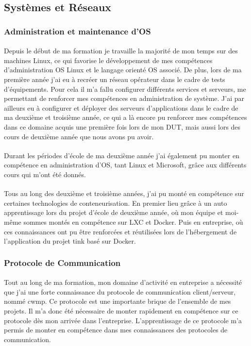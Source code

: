 \documentclass[12pt,a4paper]{report}
\begin{document}
\subsection{Systèmes et Réseaux}
\subsubsection{Administration et maintenance d'OS}
\paragraph*{}Depuis le début de ma formation je travaille la majorité de mon temps sur des machines Linux, ce qui favorise le développement de mes compétences d'administration OS Linux et le langage orienté OS associé. De plus, lors de ma première année j'ai eu à recréer un réseau opérateur dans le cadre de tests d'équipements. Pour cela il m'a fallu configurer différents services et serveurs, me permettant de renforcer mes compétences en administration de système. J'ai par ailleurs eu à configurer et déployer des serveurs d'applications dans le cadre de ma deuxième et troisième année, ce qui a là encore pu renforcer mes compétences dans ce domaine acquis une première fois lors de mon DUT, mais aussi lors des cours de deuxième année que nous avons pu avoir.
\paragraph*{}Durant les périodes d'école de ma deuxième année j'ai également pu monter en compétence en administration d'OS, tant Linux et Microsoft, grâce aux différents cours qui m'ont été donnés.
\paragraph*{}Tous au long des deuxième et troisième années, j'ai pu monté en compétence sur certaines technologies de conteneurisation. En premier lieu grâce à un auto apprentissage lors du projet d'école de deuxième année, où mon équipe et moi-même sommes montés en compétence sur LXC et Docker. Puis en entreprise, où ces connaissances ont pu être renforcées et réutilisées lors de l'hébergement de l'application du projet \gls{tink} basé sur Docker. \\
\subsubsection{Protocole de Communication}
\paragraph*{}Tout au long de ma formation, mon domaine d'activité en entreprise a nécessité que j'ai une forte connaissance du protocole de communication client/serveur, nommé \gls{cwmp}. Ce protocole est une importante brique de l'ensemble de mes projets. Il m'a donc été nécessaire de monter rapidement en compétence sur ce protocole dès mon arrivée dans l'entreprise. L’apprentissage de ce protocole m'a permis de monter en compétence dans mes connaissances des protocoles de communication.
\end{document}
